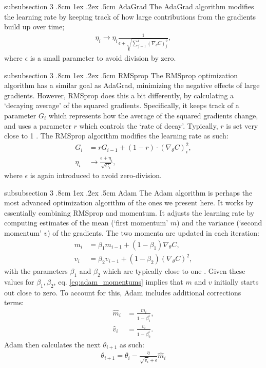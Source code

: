 \documentclass[%
reprint,s
amsmath,amssymb,
aps,
]{revtex4-2}
\makeatletter
\renewcommand{\subsubsection}{%
	\@startsection
	{subsubsection}%
	{3}%
	{\z@}%
	{.8cm \@plus1ex \@minus .2ex}%
	{.5cm}%
	{\normalfont\small\centering}%
}
\makeatother
\begin{document}
\subsubsection{AdaGrad}
The AdaGrad algorithm modifies the learning rate by keeping track of how large contributions from the gradients build up over time;
\begin{align}
	\eta_i \rightarrow \eta_i \frac{1}{\epsilon + \sqrt{\sum_{j=1}^{i}(\nabla_{\theta}C)_{j}^{2}}},
\end{align}
where \(\epsilon\) is a small parameter to avoid division by zero.

\subsubsection{RMSprop}
The RMSprop optimization algorithm has a similar goal as AdaGrad, minimizing the negative effects of large gradients. However, RMSprop does this a bit differently, by calculating a `decaying average' of the squared gradients. Specifically, it keeps track of a parameter \(G_i\) which represents how the average of the squared gradients change, and uses a parameter \(r\) which controls the `rate of decay'. Typically, \(r\) is set very close to 1 \cite{fys-stk}. The RMSprop algorithm modifies the learning rate as such:
\begin{align}
	G_i &= r G_{i-1} + (1 - r) \cdot (\nabla_{\theta}C)_{i}^{2}, \\
	\eta_i &\rightarrow \frac{\epsilon + \eta_i}{\sqrt{G_i}},
\end{align}
where \(\epsilon\) is again introduced to avoid zero-division.

\subsubsection{Adam}
The Adam algorithm is perhaps the most advanced optimization algorithm of the ones we present here. It works by essentially combining RMSprop and momentum. It adjusts the learning rate by computing estimates of the mean (`first momentum' \(m\)) and the variance (`second momentum' \(v\)) of the gradients. The two momenta are updated in each iteration:
\begin{align}	\label{eq:adam_momentums}
	m_i&=\beta_1m_{i-1}+(1-\beta_1) \nabla_\theta C,\\
    v_i&=\beta_2v_{i-1}+(1-\beta_2) (\nabla_\theta C)^2,
\end{align}
with the parameters \(\beta_1\) and \(\beta_2\) which are typically close to one \cite{fys-stk}. Given these values for \(\beta_1, \beta_2\), eq. \eqref{eq:adam_momentums} implies that \(m\) and \(v\) initially starts out close to zero. To account for this, Adam includes additional corrections terms:
\begin{align}
	\hat{m}_i &=\frac{m_i}{1-\beta_1^i},\\
    \hat{v}_i &=\frac{v_i}{1-\beta_2^i}.
\end{align}
Adam then calculates the next \(\theta_{i+1}\) as such:
\begin{align}
	\theta_{i+1}=\theta_{i}-\frac{\eta}{\sqrt{\hat{v}_i}+\epsilon}\hat{m}_i
\end{align}
\end{document}
